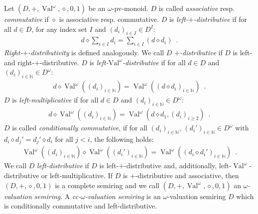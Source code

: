 \documentclass[runningheads, envcountsame, a4paper]{llncs}
\DeclareMathOperator{\Val}{Val}
\begin{document}
Let $(D,+,\Val^\omega, \diamond,0,1)$ be an $\omega$-pv-monoid. $D$ is called \emph{associative} resp. \emph{commutative} if $\diamond$ is associative resp. commutative. 
	$D$ is \emph{left-$+$-distributive} if for all $d \in D$, for any index set $I$ and $(d_i)_{i \in I}\in D^I$:
		\begin{align*}d\diamond \sum_{i \in I} d_i=\sum_{i \in I} (d \diamond d_i)\enspace. \end{align*}
	\emph{Right-${+}$-distributivity} is defined analogously. We call $D$ \emph{$+$-distributive} if $D$ is left- and right-$+$-distributive. 
$D$ is \emph{left-$\text{Val}^\omega$-distributive} if for all $d \in D$ and $(d_i)_{i \in \mathbb{N}}\in D^\omega$:
		\begin{align*}d \diamond \Val^\omega((d_i)_{i \in \mathbb{N}})=\Val^\omega((d \diamond d_i)_{i \in \mathbb{N}} ) \enspace. \end{align*}
$D$ is \emph{left-multiplicative} if for all $d \in D$ and $(d_i)_{i \in \mathbb{N}}\in D^\omega$:
		\begin{align*}d \diamond \Val^\omega((d_i)_{i \in \mathbb{N}})=\Val^\omega(d \diamond d_1,(d_i)_{i \ge 2}) \enspace. \end{align*}
$D$ is called \emph{conditionally commutative}, if for all $(d_i)_{i \in \mathbb{N}}$, $(d_i')_{i \in \mathbb{N}}\in D^\omega$ with $d_i \diamond d_j' = d_j' \diamond d_i$ for all $j < i$, the following holds:
\begin{align*} \Val^\omega((d_i)_{i \in \mathbb{N}}) \diamond \Val^\omega((d_i')_{i \in \mathbb{N}})=\Val^\omega((d_i\diamond d_i')_{i \in \mathbb{N}})\enspace. \end{align*}
	We call $D$ \emph{left-distributive} if $D$ is left-$+$-distributive and, additionally, left-$\Val^\omega$-distributive or left-multiplicative. 
	If $D$ is $+$-distributive and associative, then $(D,+, \diamond,0,1)$ is a complete semiring and we call $(D,+,\Val^\omega, \diamond,0,1)$ an \emph{$\omega$-valuation semiring}. 
	A \emph{cc-$\omega$-valuation semiring} is an $\omega$-valuation semiring $D$ which is conditionally commutative and left-distributive.
\end{document}
